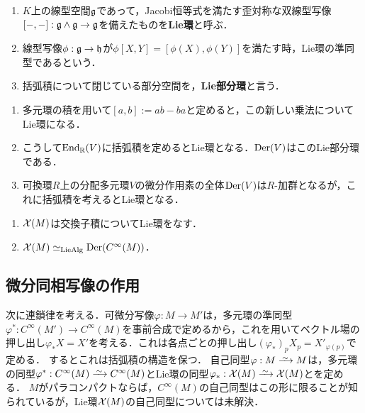 \documentclass[uplatex,dvipdfmx]{jsreport}
\begin{document}
\begin{definition}\mbox{}
    \begin{enumerate}
        \item $K$上の線型空間$\mathfrak{g}$であって，Jacobi恒等式を満たす歪対称な双線型写像$[-,-]:\mathfrak{g}\land\mathfrak{g}\to\mathfrak{g}$を備えたものを\textbf{Lie環}と呼ぶ．
        \item 線型写像$\phi:\mathfrak{g}\to\mathfrak{h}$が$\phi[X,Y]=[\phi(X),\phi(Y)]$を満たす時，Lie環の準同型であるという．
        \item 括弧積について閉じている部分空間を，\textbf{Lie部分環}と言う．
    \end{enumerate}
\end{definition}
\begin{example}\mbox{}
    \begin{enumerate}
        \item 多元環の積を用いて$[a,b]:=ab-ba$と定めると，この新しい乗法についてLie環になる．
        \item こうして$\mathrm{End}_{\mathbb{R}}(V)$に括弧積を定めるとLie環となる．$\mathrm{Der}(V)$はこのLie部分環である．
        \item 可換環$R$上の分配多元環$V$の微分作用素の全体$\mathrm{Der}(V)$は$R$-加群となるが，これに括弧積を考えるとLie環となる．
    \end{enumerate}
\end{example}

\begin{theorem}\mbox{}
    \begin{enumerate}
        \item $\mathcal{X}(M)$は交換子積についてLie環をなす．
        \item $\mathcal{X}(M)\simeq_{\mathrm{LieAlg}}\mathrm{Der}(C^\infty(M))$．
    \end{enumerate}
\end{theorem}

\subsection{微分同相写像の作用}

\begin{tcolorbox}[colframe=ForestGreen, colback=ForestGreen!10!white,breakable,colbacktitle=ForestGreen!40!white,coltitle=black,fonttitle=\bfseries\sffamily,
title=]
    次に連鎖律を考える．可微分写像$\varphi:M\to M'$は，多元環の準同型$\varphi^*:C^\infty(M')\to C^\infty(M)$を事前合成で定めるから，これを用いてベクトル場の押し出し$\varphi_*X=X'$を考える．これは各点ごとの押し出し$(\varphi_*)_pX_p=X'_{\varphi(p)}$で定める．
    するとこれは括弧積の構造を保つ．
    自己同型$\varphi:M\iso M$は，多元環の同型$\varphi^*:C^\infty(M)\iso C^\infty(M)$とLie環の同型$\varphi_*:\X(M)\iso\X(M)$とを定める．
    $M$がパラコンパクトならば，$C^\infty(M)$の自己同型はこの形に限ることが知られているが，Lie環$\mathcal{X}(M)$の自己同型については未解決．
\end{tcolorbox}
\end{document}
